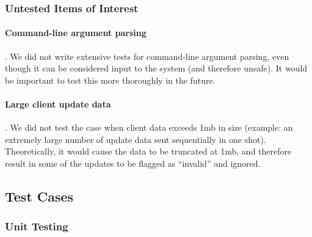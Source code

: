 \documentclass{article}
\begin{document}
\subsubsection{Untested Items of Interest} %


\paragraph{Command-line argument parsing}. We did not write extensive tests for command-line argument parsing, even though it can be considered input to the system (and therefore unsafe). It would be important to test this more thoroughly in the future.

\paragraph{Large client update data}. We did not test the case when client data exceeds 1mb in size (example: an extremely large number of update data sent sequentially in one shot). Theoretically, it would cause the data to be truncated at 1mb, and therefore result in some of the updates to be flagged as ``invalid'' and ignored.

\subsection{Test Cases}


\subsubsection{Unit Testing} %


\end{document}
